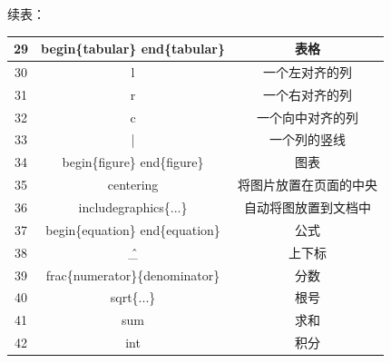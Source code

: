 \documentclass[a4paper, 12pt]{article}
\begin{document}
		\newpage
		续表：\\
		\begin{tabular}[l]{|c|c|c|}   %
		\hline
		29 & begin\{tabular\} end\{tabular\} & 表格 \\
		\hline
		30 & l & 一个左对齐的列 \\
		\hline
		31 & r & 一个右对齐的列 \\
		\hline
		32 & c & 一个向中对齐的列 \\
		\hline
		33 & | & 一个列的竖线 \\
		\hline
		34 & begin\{figure\} end\{figure\} & 图表 \\
		\hline
		35 & centering & 将图片放置在页面的中央 \\
		\hline
		36 & includegraphics\{...\} & 自动将图放置到文档中 \\
		\hline
		37 & begin\{equation\} end\{equation\} & 公式 \\
		\hline
		38 & \^  \_ & 上下标 \\
		\hline
		39 & frac\{numerator\}\{denominator\} & 分数 \\
		\hline
		40 & sqrt\{...\} & 根号 \\
		\hline
		41 & sum & 求和 \\
		\hline
		42 & int & 积分 \\
		\hline
		\end{tabular}
\end{document}
